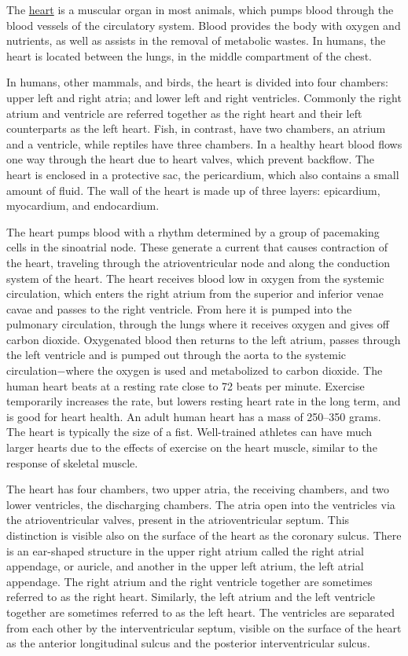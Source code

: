 The \href{https://en.wikipedia.org/wiki/Heart}{heart} is a muscular
organ in most animals, which pumps blood through the blood vessels of
the circulatory system. Blood provides the body with oxygen and
nutrients, as well as assists in the removal of metabolic wastes. In
humans, the heart is located between the lungs, in the middle
compartment of the chest.

In humans, other mammals, and birds, the heart is divided into four
chambers: upper left and right atria; and lower left and right
ventricles. Commonly the right atrium and ventricle are referred
together as the right heart and their left counterparts as the left
heart. Fish, in contrast, have two chambers, an atrium and a ventricle,
while reptiles have three chambers. In a healthy heart blood flows one
way through the heart due to heart valves, which prevent backflow. The
heart is enclosed in a protective sac, the pericardium, which also
contains a small amount of fluid. The wall of the heart is made up of
three layers: epicardium, myocardium, and endocardium.

The heart pumps blood with a rhythm determined by a group of pacemaking
cells in the sinoatrial node. These generate a current that causes
contraction of the heart, traveling through the atrioventricular node
and along the conduction system of the heart. The heart receives blood
low in oxygen from the systemic circulation, which enters the right
atrium from the superior and inferior venae cavae and passes to the
right ventricle. From here it is pumped into the pulmonary circulation,
through the lungs where it receives oxygen and gives off carbon dioxide.
Oxygenated blood then returns to the left atrium, passes through the
left ventricle and is pumped out through the aorta to the systemic
circulation−where the oxygen is used and metabolized to carbon dioxide.
The human heart beats at a resting rate close to 72 beats per minute.
Exercise temporarily increases the rate, but lowers resting heart rate
in the long term, and is good for heart health. An adult human heart has
a mass of 250--350 grams. The heart is typically the size of a fist.
Well-trained athletes can have much larger hearts due to the effects of
exercise on the heart muscle, similar to the response of skeletal
muscle.

The heart has four chambers, two upper atria, the receiving chambers,
and two lower ventricles, the discharging chambers. The atria open into
the ventricles via the atrioventricular valves, present in the
atrioventricular septum. This distinction is visible also on the surface
of the heart as the coronary sulcus. There is an ear-shaped structure in
the upper right atrium called the right atrial appendage, or auricle,
and another in the upper left atrium, the left atrial appendage. The
right atrium and the right ventricle together are sometimes referred to
as the right heart. Similarly, the left atrium and the left ventricle
together are sometimes referred to as the left heart. The ventricles are
separated from each other by the interventricular septum, visible on the
surface of the heart as the anterior longitudinal sulcus and the
posterior interventricular sulcus.

